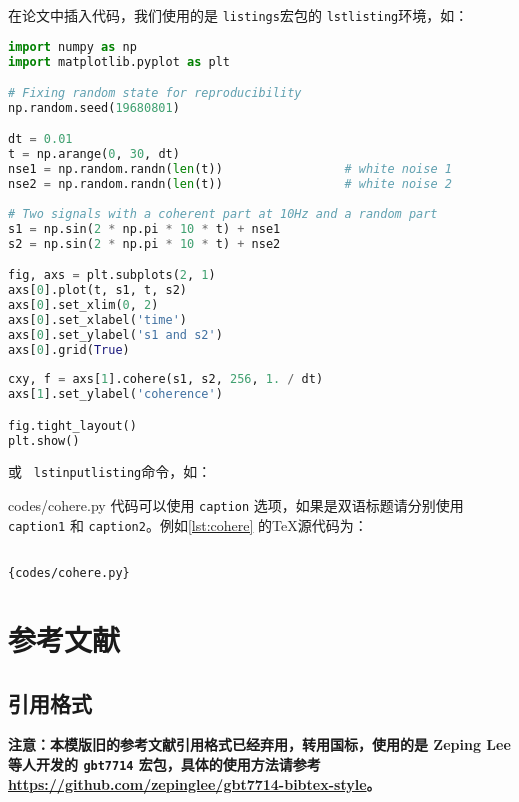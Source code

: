 在论文中插入代码，我们使用的是 \texttt{listings}宏包的 \texttt{lstlisting}环境，如：
\begin{lstlisting}[language=Python,
    caption1=Python 画图代码1,
    caption2=Python ploting code 1]
import numpy as np
import matplotlib.pyplot as plt

# Fixing random state for reproducibility
np.random.seed(19680801)

dt = 0.01
t = np.arange(0, 30, dt)
nse1 = np.random.randn(len(t))                 # white noise 1
nse2 = np.random.randn(len(t))                 # white noise 2
    
# Two signals with a coherent part at 10Hz and a random part
s1 = np.sin(2 * np.pi * 10 * t) + nse1
s2 = np.sin(2 * np.pi * 10 * t) + nse2

fig, axs = plt.subplots(2, 1)
axs[0].plot(t, s1, t, s2)
axs[0].set_xlim(0, 2)
axs[0].set_xlabel('time')
axs[0].set_ylabel('s1 and s2')
axs[0].grid(True)
 
cxy, f = axs[1].cohere(s1, s2, 256, 1. / dt)
axs[1].set_ylabel('coherence')

fig.tight_layout()
plt.show()
\end{lstlisting}
或 \texttt{ lstinputlisting}命令，如：

{codes/cohere.py}
代码可以使用 \texttt{caption} 选项，如果是双语标题请分别使用 \texttt{caption1} 和 \texttt{caption2}。例如\autoref{lst:cohere} 的\TeX{}源代码为：
\begin{lstlisting}[language=TeX]

{codes/cohere.py}
\end{lstlisting}

\section{参考文献}\label{sec:bibstyle}

\subsection{引用格式}

\textbf{注意：本模版旧的参考文献引用格式已经弃用，转用国标，使用的是 Zeping Lee 等人开发的 \texttt{gbt7714} 宏包，具体的使用方法请参考 \url{https://github.com/zepinglee/gbt7714-bibtex-style}。}

